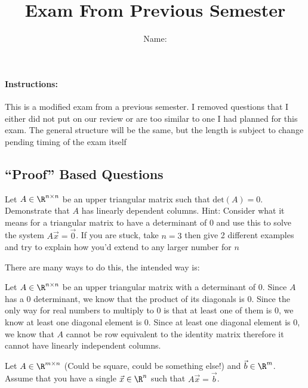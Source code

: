 \documentclass[12pt,addpoints,answers]{exam}
\title{Exam From Previous Semester}
\author{Name: \rule{150pt}{1pt}}
\begin{document}
   \maketitle

    \paragraph{Instructions:} This is a modified exam from a previous semester. I removed questions that
    I either did not put on our review or are too similar to one I had planned for this exam. The general
    structure will be the same, but the length is subject to change pending timing of the exam itself
    \vfill
    \newpage
    \begin{questions}
        \section*{``Proof'' Based Questions}
        \question[15] Let $A\in\R^{n\times n}$ be an upper triangular matrix such that $\text{det}(A)=0$.
        Demonstrate that $A$ has linearly dependent columns. Hint: Consider what it means for a triangular matrix
        to have a determinant of $0$ and use this to solve the system $A\vec{x}=\vec{0}$. If you are stuck,
        take $n=3$ then give 2 different examples and try to explain how you'd extend to any larger
        number for $n$
        \begin{solution}
            There are many ways to do this, the intended way is:

            Let $A\in\R^{n\times n}$ be an upper triangular matrix with a determinant of $0$. Since
            $A$ has a 0 determinant, we know that the product of its diagonals is $0$. Since the only
            way for real numbers to multiply to $0$ is that at least one of them is $0$, we know at
            least one diagonal element is $0$. Since at least one diagonal element is $0$, we know
            that $A$ cannot be row equivalent to the identity matrix therefore it cannot have linearly
            independent columns.
        \end{solution}
        \newpage
        \question[20] Let $A\in\R^{m\times n}$ (Could be square, could be something else!) and
        $\vec{b}\in\R^{m}$. Assume that you have a single $\vec{x}\in\R^{n}$ such that $A\vec{x} = \vec{b}$.
\end{questions}
\end{document}
